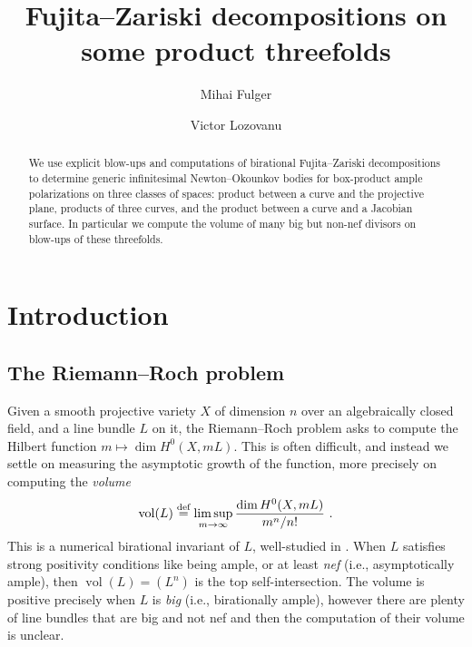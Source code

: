 \documentclass[12pt]{amsart}
\theoremstyle{definition}
\DeclareMathOperator{\vol}{vol}
\newcommand{\deq}{\ensuremath{\stackrel{\textrm{def}}{=}}}
\newcommand{\?}{ \circled{{\large\bf ?}}}
\begin{document}
\title{Fujita--Zariski decompositions on some product threefolds}

\author{Mihai Fulger}
\address{University of Connecticut, Department of Mathematics, Storrs CT 06269, USA}
\address{Institute of Mathematics of the Romanian Academy, Bucharest 010702, Romania}

\author{Victor Lozovanu}
\address{Dipartimento di Matematica, Universit\`a Degli Studi Di Genova, Genova 16146, Italy}




\begin{abstract}
	We use explicit blow-ups and computations of birational Fujita--Zariski decompositions to determine generic infinitesimal Newton--Okounkov bodies for box-product ample polarizations on three classes of spaces: product between a curve and the projective plane, products of three curves, and the product between a curve and a Jacobian surface. In particular we compute the volume of many big but non-nef divisors on blow-ups of these threefolds.
\end{abstract}

\maketitle

\section{Introduction}

\subsection{The Riemann--Roch problem}
Given a smooth projective variety $X$ of dimension $n$ over an algebraically closed field, and a line bundle $L$ on it, the Riemann--Roch problem asks to compute the Hilbert function $m\mapsto \dim H^0(X,mL)$. This is often difficult, and instead we settle on measuring the asymptotic growth of the function, more precisely on computing the \emph{volume}
\[{\rm vol}(L)\deq\limsup_{m\to\infty}\frac{\dim H^0(X,mL)}{m^n/n!}\ .\]
This is a numerical birational invariant of $L$, well-studied in \cite{Laz04}. When $L$ satisfies strong positivity conditions like being ample, or at least \emph{nef} (i.e., asymptotically ample), then $\vol(L)=(L^n)$ is the top self-intersection. The volume is positive precisely when $L$ is \emph{big} (i.e., birationally ample), however there are plenty of line bundles that are big and not nef and then the computation of their volume is unclear.
\end{document}
